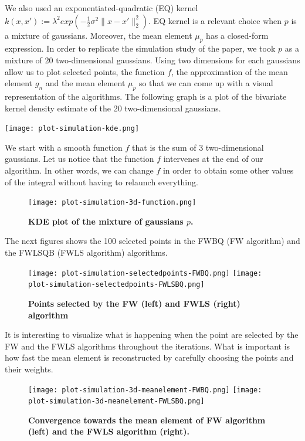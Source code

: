 We also used an exponentiated-quadratic (EQ) kernel $k(x, x') := \lambda^{2} exp(-\frac{1}{2}\sigma^{2} \| x-x' \|_{2}^{2} )$. EQ kernel is a relevant choice when $p$ is a mixture of gaussians. Moreover, the mean element $\mu_{p}$ has a closed-form expression.
In order to replicate the simulation study of the paper, we took $p$ as a mixture of 20 two-dimensional gaussians. Using two dimensions for each gaussians allow us to plot selected points, the function $f$, the approximation of the mean element $g_n$ and the mean element $\mu_{p}$ so that we can come up with a visual representation of the algorithms.
\newpage
The following graph is a plot of the bivariate kernel density estimate of the 20 two-dimensional gaussians. \\
\begin{center}
	\texttt{[image: plot-simulation-kde.png]}
\end{center}
We start with a smooth function $f$ that is the sum of 3 two-dimensional gaussians. Let us notice that the function $f$ intervenes at the end of our algorithm. In other words, we can change $f$ in order to obtain some other values of the integral without having to relaunch everything.
\begin{figure}[H]
\begin{center}
	\texttt{[image: plot-simulation-3d-function.png]}
	\caption{\textbf{KDE plot of the mixture of gaussians $p$.}}
\end{center}
\end{figure}
The next figures shows the 100 selected points in the FWBQ (FW algorithm) and the FWLSQB (FWLS algorithm) algorithms.
\begin{figure}[H]
\begin{center}
	\texttt{[image: plot-simulation-selectedpoints-FWBQ.png]}
	\texttt{[image: plot-simulation-selectedpoints-FWLSBQ.png]}
	\caption{\textbf{Points selected by the FW (left) and FWLS (right) algorithm}}
\end{center}
\end{figure}
It is interesting to visualize what is happening when the point are selected by the FW and the FWLS algorithms throughout the iterations. What is important is how fast the mean element is reconstructed by carefully choosing the points and their weights.
\begin{figure}[H]
\begin{center}
	\texttt{[image: plot-simulation-3d-meanelement-FWBQ.png]}
	\texttt{[image: plot-simulation-3d-meanelement-FWLSBQ.png]}
	\caption{\textbf{Convergence towards the mean element of FW algorithm (left) and the FWLS algorithm (right).}}
\end{center}
\end{figure}
